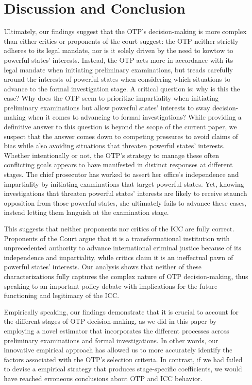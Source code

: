 \section*{Discussion and Conclusion}

Ultimately, our findings suggest that the OTP's decision-making is more complex than either critics or proponents of the court suggest: the OTP neither strictly adheres to its legal mandate, nor is it solely driven by the need to kowtow to powerful states' interests. Instead, the OTP acts more in accordance with its legal mandate when initiating preliminary examinations, but treads carefully around the interests of powerful states when considering which situations to advance to the formal investigation stage. A critical question is: why is this the case? Why does the OTP seem to prioritize impartiality when initiating preliminary examinations but allow powerful states' interests to sway decision-making when it comes to advancing to formal investigations? While providing a definitive answer to this question is beyond the scope of the current paper, we suspect that the answer comes down to competing pressures to avoid claims of bias while also avoiding situations that threaten powerful states' interests. Whether intentionally or not, the OTP's strategy to manage these often conflicting goals appears to have manifested in distinct responses at different stages. The chief prosecutor has worked to assert her office's independence and impartiality by initiating examinations that target powerful states. Yet, knowing investigations that threaten powerful states' interests are likely to receive staunch opposition from those powerful states, she ultimately fails to advance these cases, instead letting them languish at the examination stage. 

This suggests that neither proponents nor critics of the ICC are fully correct. Proponents of the Court argue that it is a transformational institution with unprecedented authority to advance international criminal justice because of its independence and impartiality, while critics claim it is an ineffectual pawn of powerful states' interests. Our analysis shows that neither of these characterizations fully captures the complex nature of OTP decision-making, thus speaking to an important policy debate with implications for the future functioning and legitimacy of the ICC.

Empirically speaking, our findings demonstrate that it is crucial to account for the different stages of OTP decision-making, as we did in this paper by employing a novel estimator that incorporates the different processes across preliminary examinations and formal investigations. In other words, our innovative empirical approach has allowed us to more accurately identify the factors associated with the OTP's selection criteria. In contrast, if we had failed to devise a empirical strategy that produces stage-specific coefficients, we would have reached erroneous conclusions about OTP and ICC behavior. 

